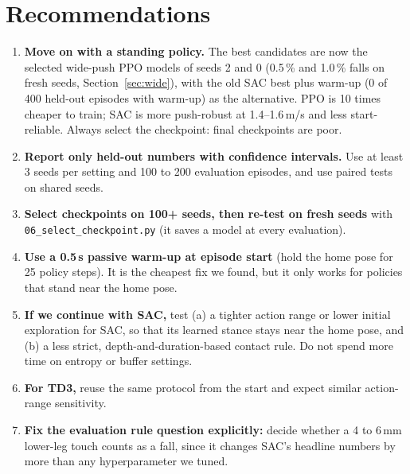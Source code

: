 \documentclass[11pt,a4paper]{article}
\begin{document}
\section{Recommendations}
\begin{enumerate}
\item \textbf{Move on with a standing policy.} The best candidates are now the selected wide-push PPO models of seeds 2 and 0 (0.5\,\% and 1.0\,\% falls on fresh seeds, Section~\ref{sec:wide}), with the old SAC best plus warm-up (0 of 400 held-out episodes with warm-up) as the alternative. PPO is 10 times cheaper to train; SAC is more push-robust at 1.4--1.6\,m/s and less start-reliable. Always select the checkpoint: final checkpoints are poor.
\item \textbf{Report only held-out numbers with confidence intervals.} Use at least 3 seeds per setting and 100 to 200 evaluation episodes, and use paired tests on shared seeds.
\item \textbf{Select checkpoints on 100+ seeds, then re-test on fresh seeds} with \texttt{06\_select\_checkpoint.py} (it saves a model at every evaluation).
\item \textbf{Use a 0.5\,s passive warm-up at episode start} (hold the home pose for 25 policy steps). It is the cheapest fix we found, but it only works for policies that stand near the home pose. \item \textbf{If we continue with SAC,} test (a) a tighter action range or lower initial exploration for SAC, so that its learned stance stays near the home pose, and (b) a less strict, depth-and-duration-based contact rule. Do not spend more time on entropy or buffer settings.
\item \textbf{For TD3,} reuse the same protocol from the start and expect similar action-range sensitivity.
\item \textbf{Fix the evaluation rule question explicitly:} decide whether a 4 to 6\,mm lower-leg touch counts as a fall, since it changes SAC's headline numbers by more than any hyperparameter we tuned.
\end{enumerate}
\end{document}
